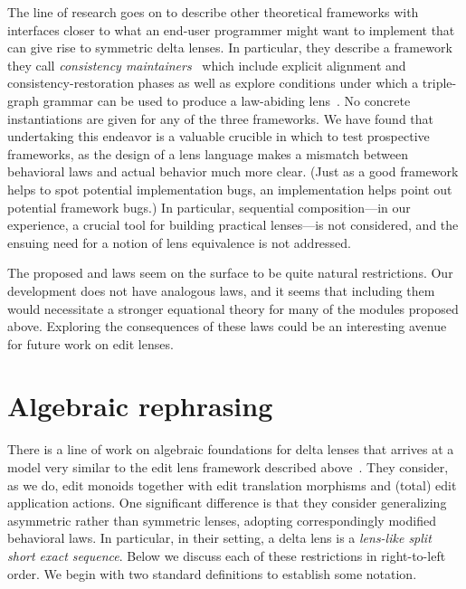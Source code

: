The line of research goes on to describe other theoretical
frameworks with interfaces closer to what an end-user programmer might want
to implement that can give rise to symmetric delta lenses. In particular,
they describe a framework they call \emph{consistency
maintainers}~\cite{Diskin-Delta11} which include explicit alignment and
consistency-restoration phases as well as explore conditions under which a
triple-graph grammar can be used to produce a law-abiding
lens~\cite{hermann2011correctness}. No concrete instantiations are given for
any of the three frameworks. We have found that undertaking this endeavor is
a valuable crucible in which to test prospective frameworks, as the design
of a lens language makes a mismatch between behavioral laws and actual
behavior much more clear. (Just as a good framework helps to spot
potential implementation bugs, an implementation helps point out potential
framework bugs.) In particular, sequential composition---in our experience,
a crucial tool for building practical lenses---is not considered, and the
ensuing need for a notion of lens equivalence is not addressed.

The proposed  and  laws seem on the surface to
be quite natural restrictions. Our development does not have analogous laws,
and it seems that including them would necessitate a stronger equational
theory for many of the modules proposed above. Exploring the consequences of
these laws could be an interesting avenue for future work on edit lenses.

\section{Algebraic rephrasing}
\label{sec:algebraic}
There is a line of work on algebraic foundations for delta lenses that
arrives at a model very similar to the edit lens framework described
above~\cite{stevens2008tat}. They consider, as we do, edit monoids together
with edit translation morphisms and (total) edit application actions.
One significant difference is that they consider generalizing asymmetric
rather than symmetric lenses, adopting correspondingly modified behavioral
laws. In particular, in their setting, a delta lens is a \emph{lens-like
split short exact sequence}. Below we discuss each of these restrictions in
right-to-left order. We begin with two standard definitions to establish
some notation.

